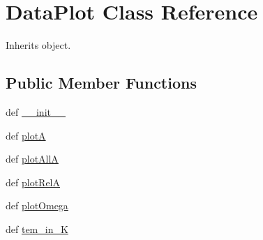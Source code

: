 \hypertarget{classpyneb_1_1plot_1_1plot_atomic_data_1_1_data_plot}{\section{Data\-Plot Class Reference}
\label{classpyneb_1_1plot_1_1plot_atomic_data_1_1_data_plot}
}


Inherits object.

\subsection*{Public Member Functions}
\begin{DoxyCompactItemize}
\item 
def \hyperlink{classpyneb_1_1plot_1_1plot_atomic_data_1_1_data_plot_ac775ee34451fdfa742b318538164070e}{\-\_\-\-\_\-init\-\_\-\-\_\-}
\item 
def \hyperlink{classpyneb_1_1plot_1_1plot_atomic_data_1_1_data_plot_a5a124b4b90f3902a500c28580f06a135}{plot\-A}
\item 
def \hyperlink{classpyneb_1_1plot_1_1plot_atomic_data_1_1_data_plot_aa4c67c06f90c7e2250245b6b131dfb59}{plot\-All\-A}
\item 
def \hyperlink{classpyneb_1_1plot_1_1plot_atomic_data_1_1_data_plot_ac0a814e85d696da65c14ac123d90df84}{plot\-Rel\-A}
\item 
def \hyperlink{classpyneb_1_1plot_1_1plot_atomic_data_1_1_data_plot_afd1ca8b0bda1af295e212e79dad07e55}{plot\-Omega}
\item 
def \hyperlink{classpyneb_1_1plot_1_1plot_atomic_data_1_1_data_plot_ab509d6f1f1591fff8316c4aca0ff42d4}{tem\-\_\-in\-\_\-\-K}
\end{DoxyCompactItemize}
